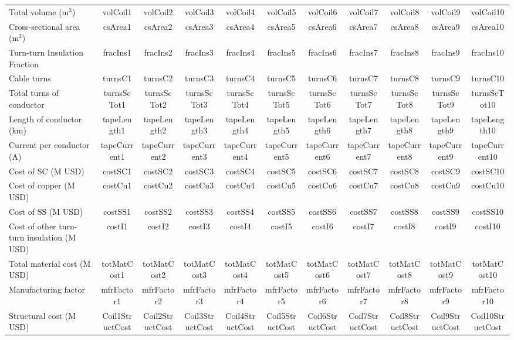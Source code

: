 \begin{table}[h]
{\begin{tabular}{lcccccccccc}
Total volume (m$^3$) & volCoil1 & volCoil2 & volCoil3 & volCoil4 & volCoil5 & volCoil6 & volCoil7 & volCoil8 & volCoil9 & volCoil10 \\
Cross-sectional area (m$^2$) & csArea1 & csArea2 & csArea3 & csArea4 & csArea5 & csArea6 & csArea7 & csArea8 & csArea9 & csArea10 \\
Turn-turn Insulation Fraction & fracIns1 & fracIns2 & fracIns3 & fracIns4 & fracIns5 & fracIns6 & fracIns7 & fracIns8 & fracIns9 & fracIns10 \\
\hline
Cable turns & turnsC1 & turnsC2 & turnsC3 & turnsC4 & turnsC5 & turnsC6 & turnsC7 & turnsC8 & turnsC9 & turnsC10 \\
Total turns of conductor & turnsScTot1 & turnsScTot2 & turnsScTot3 & turnsScTot4 & turnsScTot5 & turnsScTot6 & turnsScTot7 & turnsScTot8 & turnsScTot9 & turnsScTot10 \\
Length of conductor (km) & tapeLength1 & tapeLength2 & tapeLength3 & tapeLength4 & tapeLength5 & tapeLength6 & tapeLength7 & tapeLength8 & tapeLength9 & tapeLength10 \\
Current per conductor (A) & tapeCurrent1 & tapeCurrent2 & tapeCurrent3 & tapeCurrent4 & tapeCurrent5 & tapeCurrent6 & tapeCurrent7 & tapeCurrent8 & tapeCurrent9 & tapeCurrent10 \\
\hline
Cost of SC (M USD) & costSC1 & costSC2 & costSC3 & costSC4 & costSC5 & costSC6 & costSC7 & costSC8 & costSC9 & costSC10 \\
Cost of copper (M USD) & costCu1 & costCu2 & costCu3 & costCu4 & costCu5 & costCu6 & costCu7 & costCu8 & costCu9 & costCu10 \\
Cost of SS (M USD) & costSS1 & costSS2 & costSS3 & costSS4 & costSS5 & costSS6 & costSS7 & costSS8 & costSS9 & costSS10 \\
Cost of other turn-turn insulation (M USD) & costI1 & costI2 & costI3 & costI4 & costI5 & costI6 & costI7 & costI8 & costI9 & costI10 \\
Total material cost (M USD) & totMatCost1 & totMatCost2 & totMatCost3 & totMatCost4 & totMatCost5 & totMatCost6 & totMatCost7 & totMatCost8 & totMatCost9 & totMatCost10 \\
Manufacturing factor & mfrFactor1 & mfrFactor2 & mfrFactor3 & mfrFactor4 & mfrFactor5 & mfrFactor6 & mfrFactor7 & mfrFactor8 & mfrFactor9 & mfrFactor10 \\
Structural cost (M USD) & Coil1StructCost & Coil2StructCost & Coil3StructCost & Coil4StructCost & Coil5StructCost & Coil6StructCost & Coil7StructCost & Coil8StructCost & Coil9StructCost & Coil10StructCost \\

\end{tabular}}
\end{table}
